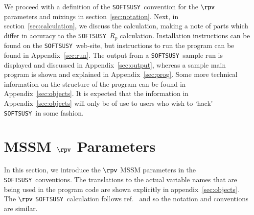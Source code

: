 \documentclass[final,3p,times,pdflatex]{elsarticle}
\def\SOFTSUSY{{\tt SOFTSUSY}}
\begin{document}
We proceed with a definition of the \SOFTSUSY~convention for the $\rpv$
parameters and mixings in section~\ref{sec:notation}. Next, in
section~\ref{sec:calculation}, we discuss the calculation, making a note of
parts which differ in accuracy to the \SOFTSUSY~$R_p$ calculation. 
Installation instructions can be found on the \SOFTSUSY~web-site, but
instructions to run the program can be found in Appendix~\ref{sec:run}. 
The output from a \SOFTSUSY~sample run is displayed and discussed in
Appendix~\ref{sec:output},
whereas a sample main program is shown and explained in
Appendix~\ref{sec:prog}. Some more technical information on the structure of
the program can be found in Appendix~\ref{sec:objects}. 
It is expected that the information in Appendix~\ref{sec:objects} will only be
of use to users who wish to 
`hack' \SOFTSUSY~in some fashion. 

\section{MSSM $\rpv$ Parameters \label{sec:notation}}

In this section, we introduce the $\rpv$ MSSM parameters
in the \SOFTSUSY~conventions. The translations to the actual variable
names that are being used in the program code are shown explicitly in
appendix~\ref{sec:objects}. The $\rpv$ \SOFTSUSY~calculation follows 
ref.~\cite{Allanach:2003eb} and so the notation and conventions are 
similar. 
\end{document}
